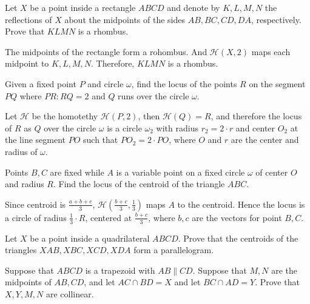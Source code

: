 \documentclass[11pt,twoside]{scrartcl}
\begin{document}
\begin{problem}
    Let $X$ be a point inside a rectangle $ABCD$ and denote by $K, L, M, N$ the reflections of $X$ about the midpoints of the sides $AB, BC, CD, DA$, respectively. Prove that $KLMN$ is a rhombus.
    \begin{sketch}
        The midpoints of the rectangle form a rohombus. And $\mathcal{H}(X, 2)$ maps each midpoint to $K, L, M, N$. Therefore, $KLMN$ is a rhombus.
    \end{sketch}
\end{problem}

\begin{problem}
    Given a fixed point $P$ and circle $\omega$, find the locus of the points $R$ on the segment $PQ$ where $PR:RQ = 2$ and $Q$ runs over the circle $\omega$.
    \begin{sketch}
        Let $\mathcal{H}$ be the homotethy $\mathcal{H}(P, 2)$, then $\mathcal{H}(Q) = R$, and therefore the locus of $R$ as $Q$ over the circle $\omega$ is a circle $\omega_2$ with radius $r_2 = 2\cdot r$ and center $O_2$ at the line segment $PO$ such that $PO_2 = 2 \cdot PO$, where $O$ and $r$ are the center and radius of $\omega$. 
    \end{sketch}
\end{problem}

\begin{problem}
    Points $B, C$ are fixed while $A$ is a variable point on a fixed circle $\omega$ of center $O$ and radius $R$. Find the locus of the centroid of the triangle $ABC$.
    \begin{sketch}
        Since centroid is $\frac{a+b+c}{3}$, $\mathcal{H}(\frac{b+c}{3}, \frac{1}{3})$ maps $A$ to the centroid. Hence the locus is a circle of radius $\frac{1}{3}\cdot R$, centered at $\frac{b+c}{3}$, where $b, c$ are the vectors for point $B, C$.
    \end{sketch}
\end{problem}

\begin{problem}
    Let $X$ be a point inside a quadrilateral $ABCD$. Prove that the centroids of the triangles $XAB, XBC, XCD, XDA$ form a parallelogram.
    \begin{sketch}
        \TBD 
    \end{sketch}
\end{problem}

\begin{problem}
    Suppose that $ABCD$ is a trapezoid with $AB \parallel CD$. Suppose that $M, N$ are the midpoints of $AB,CD$, and let $AC \cap BD = X$ and let $BC \cap AD = Y$. Prove that $X, Y, M, N$ are collinear.
    \begin{sketch}
        \TBD 
    \end{sketch}
\end{problem}
\end{document}
